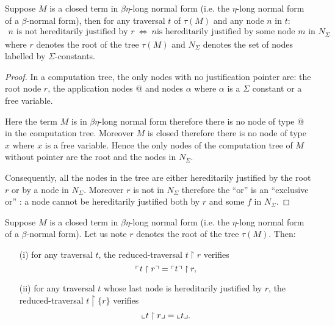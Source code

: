 \begin{property}
\label{proper:betaeta_trav}
Suppose $M$ is a closed term in $\beta \eta$-long normal form (i.e. the $\eta$-long normal form of a $\beta$-normal form), then
for any traversal $t$ of $\tau(M)$ and any node $n$ in $t$:
\begin{eqnarray*}
n \mbox{ is not hereditarily justified by } r  \  \iff \   n \mbox{
is hereditarily justified by some node $m$ in } N_\Sigma
\end{eqnarray*}
where $r$ denotes the root of the tree
$\tau(M)$ and $N_\Sigma$ denotes the set of nodes labelled by $\Sigma$-constants.
\end{property}
\begin{proof}
In a computation tree, the only nodes with no justification pointer are:
the root node $r$, the application nodes $@$ and nodes $\alpha$ where $\alpha$ is a $\Sigma$ constant or a free variable.

Here the term $M$ is in $\beta \eta$-long normal form therefore there is no node of type $@$ in the computation tree.
Moreover $M$ is closed therefore there is no node of type $x$ where $x$ is a
free variable. Hence the only nodes of the computation tree of $M$ without pointer are the root and the nodes in $N_\Sigma$.

Consequently, all the nodes in the tree are either hereditarily justified by the root $r$ or by a node in $N_\Sigma$. Moreover $r$ is not in
$N_\Sigma$ therefore the ``or'' is an ``exclusive or'' : a node cannot be hereditarily justified both by $r$ and some $f$ in $N_\Sigma$.
\end{proof}

\begin{lem}
\label{lem:redtrav_trav} Suppose $M$ is a closed term in $\beta
\eta$-long normal form (i.e. the $\eta$-long normal form of a
$\beta$-normal form). Let us note $r$ denotes the root of the tree
$\tau(M)$. Then:
\begin{itemize}
\item[(i)] for any traversal $t$, the reduced-traversal $t \upharpoonright r $ verifies
$$ \ulcorner t \upharpoonright  r  \urcorner = \ulcorner t \urcorner \upharpoonright r ,$$
\item[(ii)] for any traversal $t$ whose last node is hereditarily justified by $r$,
     the reduced-traversal $t \upharpoonright \{ r \}$ verifies
    $$ \llcorner t \upharpoonright r  \lrcorner = \llcorner t \lrcorner.$$
\end{itemize}
\end{lem}

